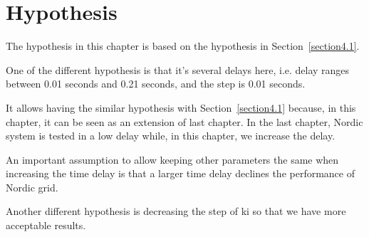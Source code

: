 \section{Hypothesis} %
The hypothesis in this chapter is based on the hypothesis in Section~\ref{section4.1}.  
 
One of the different hypothesis is that it's several delays here, i.e. delay ranges between 0.01 seconds and 0.21 seconds, and the step is 0.01 seconds.  

It allows having the similar hypothesis with Section~\ref{section4.1} because, in this chapter, it can be seen as an extension of last chapter. In the last chapter, Nordic system is tested in a low delay while, in this chapter, we increase the delay.  

An important assumption to allow keeping other parameters the same when increasing the time delay is that a larger time delay declines the performance of Nordic grid.  

Another different hypothesis is decreasing the step of ki so that we have more acceptable results.  